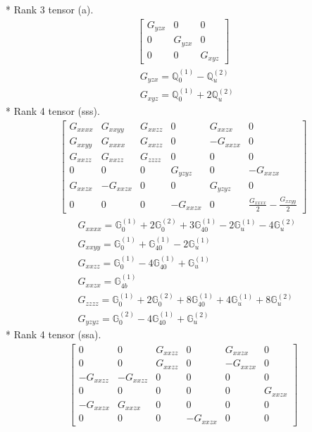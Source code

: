 \documentclass[fleqn,8pt,landscape]{jsarticle}
\begin{document}
* Rank 3 tensor (a).
\begin{align*}
\begin{bmatrix} G_{yzx} & 0 & 0 \\ 0 & G_{yzx} & 0 \\ 0 & 0 & G_{xyz} \end{bmatrix}
\end{align*}
\begin{align*}
& G_{yzx} = \mathbb{Q}_{0}^{(1)} - \mathbb{Q}_{u}^{(2)} \\
& G_{xyz} = \mathbb{Q}_{0}^{(1)} + 2 \mathbb{Q}_{u}^{(2)}
\end{align*}
* Rank 4 tensor (sss).
\begin{align*}
\begin{bmatrix} G_{xxxx} & G_{xxyy} & G_{xxzz} & 0 & G_{xxzx} & 0 \\ G_{xxyy} & G_{xxxx} & G_{xxzz} & 0 & - G_{xxzx} & 0 \\ G_{xxzz} & G_{xxzz} & G_{zzzz} & 0 & 0 & 0 \\ 0 & 0 & 0 & G_{yzyz} & 0 & - G_{xxzx} \\ G_{xxzx} & - G_{xxzx} & 0 & 0 & G_{yzyz} & 0 \\ 0 & 0 & 0 & - G_{xxzx} & 0 & \frac{G_{xxxx}}{2} - \frac{G_{xxyy}}{2} \end{bmatrix}
\end{align*}
\begin{align*}
& G_{xxxx} = \mathbb{G}_{0}^{(1)} + 2 \mathbb{G}_{0}^{(2)} + 3 \mathbb{G}_{40}^{(1)} - 2 \mathbb{G}_{u}^{(1)} - 4 \mathbb{G}_{u}^{(2)} \\
& G_{xxyy} = \mathbb{G}_{0}^{(1)} + \mathbb{G}_{40}^{(1)} - 2 \mathbb{G}_{u}^{(1)} \\
& G_{xxzz} = \mathbb{G}_{0}^{(1)} - 4 \mathbb{G}_{40}^{(1)} + \mathbb{G}_{u}^{(1)} \\
& G_{xxzx} = \mathbb{G}_{4b}^{(1)} \\
& G_{zzzz} = \mathbb{G}_{0}^{(1)} + 2 \mathbb{G}_{0}^{(2)} + 8 \mathbb{G}_{40}^{(1)} + 4 \mathbb{G}_{u}^{(1)} + 8 \mathbb{G}_{u}^{(2)} \\
& G_{yzyz} = \mathbb{G}_{0}^{(2)} - 4 \mathbb{G}_{40}^{(1)} + \mathbb{G}_{u}^{(2)}
\end{align*}
* Rank 4 tensor (ssa).
\begin{align*}
\begin{bmatrix} 0 & 0 & G_{xxzz} & 0 & G_{xxzx} & 0 \\ 0 & 0 & G_{xxzz} & 0 & - G_{xxzx} & 0 \\ - G_{xxzz} & - G_{xxzz} & 0 & 0 & 0 & 0 \\ 0 & 0 & 0 & 0 & 0 & G_{xxzx} \\ - G_{xxzx} & G_{xxzx} & 0 & 0 & 0 & 0 \\ 0 & 0 & 0 & - G_{xxzx} & 0 & 0 \end{bmatrix}
\end{align*}
\end{document}
